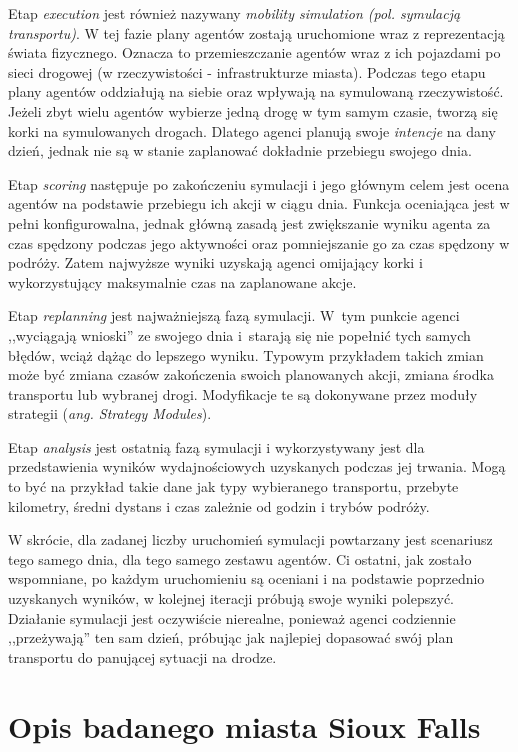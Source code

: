 \documentclass[twoside,12pt]{report}
\begin{document}
Etap \textit{execution} jest również nazywany \textit{mobility simulation (pol. symulacją transportu)}. W tej fazie plany agentów zostają uruchomione wraz z reprezentacją świata fizycznego. Oznacza to przemieszczanie agentów wraz z ich pojazdami po sieci drogowej (w rzeczywistości - infrastrukturze miasta). Podczas tego etapu plany agentów oddziałują na siebie oraz wpływają na symulowaną rzeczywistość. Jeżeli zbyt wielu agentów wybierze jedną drogę w tym samym czasie, tworzą się korki na symulowanych drogach. Dlatego agenci planują swoje \textit{intencje} na dany dzień, jednak nie są w stanie zaplanować dokładnie przebiegu swojego dnia.

Etap \textit{scoring} następuje po zakończeniu symulacji i jego głównym celem jest ocena agentów na podstawie przebiegu ich akcji w ciągu dnia. Funkcja oceniająca jest w pełni konfigurowalna, jednak główną zasadą jest zwiększanie wyniku agenta  za czas spędzony podczas jego aktywności oraz pomniejszanie go za czas spędzony w podróży. Zatem najwyższe wyniki uzyskają agenci omijający korki i wykorzystujący maksymalnie czas na zaplanowane akcje.

Etap \textit{replanning} jest najważniejszą fazą symulacji. W~tym punkcie agenci ,,wyciągają wnioski'' ze swojego dnia i~starają się nie popełnić tych samych błędów, wciąż dążąc do lepszego wyniku. Typowym przykładem takich zmian może być zmiana czasów zakończenia swoich planowanych akcji, zmiana środka transportu lub wybranej drogi. Modyfikacje te są dokonywane przez moduły strategii (\textit{ang. Strategy Modules}).

Etap \textit{analysis} jest ostatnią fazą symulacji i wykorzystywany jest dla przedstawienia wyników wydajnościowych uzyskanych podczas jej trwania. Mogą to być na przykład takie dane jak typy wybieranego transportu, przebyte kilometry, średni dystans i czas zależnie od godzin i trybów podróży. 

W skrócie, dla zadanej liczby uruchomień symulacji powtarzany jest scenariusz tego samego dnia, dla tego samego zestawu agentów. Ci ostatni, jak zostało wspomniane, po każdym uruchomieniu są oceniani i na podstawie poprzednio uzyskanych wyników, w kolejnej iteracji próbują swoje wyniki polepszyć. Działanie symulacji jest oczywiście nierealne, ponieważ agenci codziennie ,,przeżywają'' ten sam dzień, próbując jak najlepiej dopasować swój plan transportu do panującej sytuacji na drodze.

\section{Opis badanego miasta Sioux Falls}\label{rozdz.opis_siouxfalls}
\end{document}
